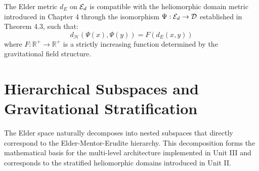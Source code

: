 \begin{proposition}
The Elder metric $d_E$ on $\mathcal{E}_{d}$ is compatible with the heliomorphic domain metric introduced in Chapter 4 through the isomorphism $\Psi: \mathcal{E}_{d} \rightarrow \mathcal{D}$ established in Theorem 4.3, such that:
\begin{equation}
d_{\mathcal{H}}(\Psi(x), \Psi(y)) = F(d_E(x, y))
\end{equation}
where $F: \mathbb{R}^+ \rightarrow \mathbb{R}^+$ is a strictly increasing function determined by the gravitational field structure.
\end{proposition}

\section{Hierarchical Subspaces and Gravitational Stratification}

The Elder space naturally decomposes into nested subspaces that directly correspond to the Elder-Mentor-Erudite hierarchy. This decomposition forms the mathematical basis for the multi-level architecture implemented in Unit III and corresponds to the stratified heliomorphic domains introduced in Unit II.

